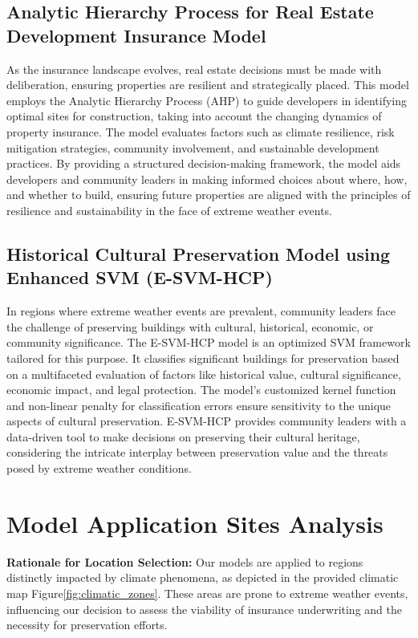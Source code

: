 \documentclass{mcmthesis}
\begin{document}
\subsection{Analytic Hierarchy Process for Real Estate Development Insurance Model}
As the insurance landscape evolves, real estate decisions must be made with deliberation, ensuring properties are resilient and strategically placed. This model employs the Analytic Hierarchy Process (AHP) to guide developers in identifying optimal sites for construction, taking into account the changing dynamics of property insurance. The model evaluates factors such as climate resilience, risk mitigation strategies, community involvement, and sustainable development practices. By providing a structured decision-making framework, the model aids developers and community leaders in making informed choices about where, how, and whether to build, ensuring future properties are aligned with the principles of resilience and sustainability in the face of extreme weather events.

\subsection{Historical Cultural Preservation Model using Enhanced SVM (E-SVM-HCP)}
In regions where extreme weather events are prevalent, community leaders face the challenge of preserving buildings with cultural, historical, economic, or community significance. The E-SVM-HCP model is an optimized SVM framework tailored for this purpose. It classifies significant buildings for preservation based on a multifaceted evaluation of factors like historical value, cultural significance, economic impact, and legal protection. The model's customized kernel function and non-linear penalty for classification errors ensure sensitivity to the unique aspects of cultural preservation. E-SVM-HCP provides community leaders with a data-driven tool to make decisions on preserving their cultural heritage, considering the intricate interplay between preservation value and the threats posed by extreme weather conditions.

\section{Model Application Sites Analysis}
\textbf{Rationale for Location Selection:} Our models are applied to regions distinctly impacted by climate phenomena, as depicted in the provided climatic map Figure\ref{fig:climatic_zones}. These areas are prone to extreme weather events, influencing our decision to assess the viability of insurance underwriting and the necessity for preservation efforts.
\end{document}
